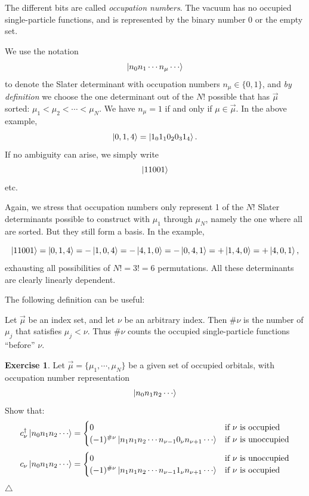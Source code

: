 \documentclass{report}
\theoremstyle{plain}
\theoremstyle{definition}
\newtheorem{exerc}{Exercise}[chapter]
\newcommand\xqed[1]{%
  \leavevmode\unskip\penalty9999 \hbox{}\nobreak\hfill
  \quad\hbox{#1}}
\newcommand\demo{\xqed{$\triangle$}}
\newenvironment{exercise}{\bigskip\begin{exerc}}{\demo\end{exerc}\bigskip}
\begin{document}
The different bits are called \emph{occupation numbers}. The vacuum
has no occupied single-particle functions, and is represented by the
binary number $0$ or the empty set.

We use the notation
\[ \ket{n_0 n_1 \cdots n_\mu \cdots }\] to denote the Slater
determinant with occupation numbers $n_\mu \in \{0, 1\}$, and \emph{by
  definition} we choose the one determinant out of the $N!$ possible
that has $\vec{\mu}$ sorted: $\mu_1<\mu_2<\cdots<\mu_N$. We have
$n_\mu = 1$ if and only if $\mu \in \vec{\mu}$. In the above example,
\begin{equation}
  \ket{0, 1, 4} = \ket{1_0 1_1 0_2 0_3 1_4 }.
\end{equation}
If no ambiguity can arise, we simply write 
\[ \ket{11001} \]
etc.

Again, we stress that occupation numbers only represent 1 of the $N!$
Slater determinants possible to construct with $\mu_1$ through
$\mu_N$, namely the one where all are sorted. But they still form a
basis.
In the example,

\begin{equation}
  \ket{11001} = \ket{0,1,4} = -\ket{1,0,4} = -\ket{4,1,0} =
  -\ket{0,4,1} = +\ket{1,4,0} = +\ket{4,0,1},
\end{equation}
exhausting all possibilities of $N! = 3! = 6$ permutations. All these
determinants are clearly linearly dependent.

The following definition can be useful:

Let $\vec{\mu}$ be an index set, and let $\nu$ be an arbitrary
index. Then $\#\nu$ is the number of $\mu_j$ that satisfies
$\mu_j<\nu$. Thus $\#\nu$ counts the occupied single-particle functions ``before'' $\nu$.

\begin{exercise}\label{exercise:occupation}
  Let $\vec{\mu} = \{\mu_1,\cdots,\mu_N\}$ be a given set of occupied
  orbitals, with occupation number representation
  \[ \ket{n_{0} n_{1} n_{2} \cdots } \]
  Show that:
  \begin{equation}
    c^\dag_\nu \ket{ n_0 n_1 n_2 \cdots } = 
    \begin{cases}
      0 & \text{if $\nu$ is occupied} \\
      (-1)^{\#\nu} \ket { n_1 n_1 n_2 \cdots n_{\nu-1} 0_\nu n_{\nu+1} \cdots} &
      \text{if $\nu$ is unoccupied}
    \end{cases}
  \end{equation}
  \begin{equation}
    c_\nu \ket{ n_0 n_1 n_2 \cdots } = 
    \begin{cases}
      0 & \text{if $\nu$ is unoccupied} \\
      (-1)^{\#\nu} \ket { n_1 n_1 n_2 \cdots n_{\nu-1} 1_\nu n_{\nu+1} \cdots} &
      \text{if $\nu$ is occupied}
    \end{cases}
  \end{equation}
\end{exercise}
\end{document}
